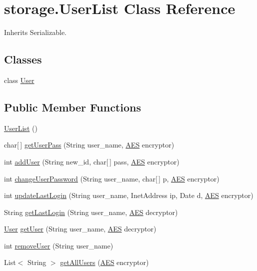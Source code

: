 \hypertarget{classstorage_1_1_user_list}{
\section{storage.\-User\-List \-Class \-Reference}
\label{classstorage_1_1_user_list}
}


\-Inherits \-Serializable.

\subsection*{\-Classes}
\begin{DoxyCompactItemize}
\item 
class \hyperlink{classstorage_1_1_user_list_1_1_user}{\-User}
\end{DoxyCompactItemize}
\subsection*{\-Public \-Member \-Functions}
\begin{DoxyCompactItemize}
\item 
\hyperlink{classstorage_1_1_user_list_a1fee2d2547053fde2acd9620e5dcf925}{\-User\-List} ()
\item 
char\mbox{[}$\,$\mbox{]} \hyperlink{classstorage_1_1_user_list_af0cde20eceb2bc67215fa3be915c1a46}{get\-User\-Pass} (\-String user\-\_\-name, \hyperlink{classsecurity_1_1_a_e_s}{\-A\-E\-S} encryptor)
\item 
int \hyperlink{classstorage_1_1_user_list_ae5d8340ca4f812fc89b888d7fa2abc58}{add\-User} (\-String new\-\_\-id, char\mbox{[}$\,$\mbox{]} pass, \hyperlink{classsecurity_1_1_a_e_s}{\-A\-E\-S} encryptor)
\item 
int \hyperlink{classstorage_1_1_user_list_a3d1a92d4bceac1f08771b76cd0bb5a22}{change\-User\-Password} (\-String user\-\_\-name, char\mbox{[}$\,$\mbox{]} p, \hyperlink{classsecurity_1_1_a_e_s}{\-A\-E\-S} encryptor)
\item 
int \hyperlink{classstorage_1_1_user_list_a1570a22279d2d19ea6d02618f56a36e4}{update\-Last\-Login} (\-String user\-\_\-name, \-Inet\-Address ip, \-Date d, \hyperlink{classsecurity_1_1_a_e_s}{\-A\-E\-S} encryptor)
\item 
\-String \hyperlink{classstorage_1_1_user_list_acb6b63b95de0ff5269d2cf42522ecd63}{get\-Last\-Login} (\-String user\-\_\-name, \hyperlink{classsecurity_1_1_a_e_s}{\-A\-E\-S} decryptor)
\item 
\hyperlink{classstorage_1_1_user_list_1_1_user}{\-User} \hyperlink{classstorage_1_1_user_list_ad1e39d2075d7f2f7f6f8fe16a4ee8adf}{get\-User} (\-String user\-\_\-name, \hyperlink{classsecurity_1_1_a_e_s}{\-A\-E\-S} decryptor)
\item 
int \hyperlink{classstorage_1_1_user_list_a767c1937bae97f5ff3475bf40ccb3f2c}{remove\-User} (\-String user\-\_\-name)
\item 
\-List$<$ \-String $>$ \hyperlink{classstorage_1_1_user_list_a3e333c83b3429295e8167023656d9d45}{get\-All\-Users} (\hyperlink{classsecurity_1_1_a_e_s}{\-A\-E\-S} encryptor)
\end{DoxyCompactItemize}


